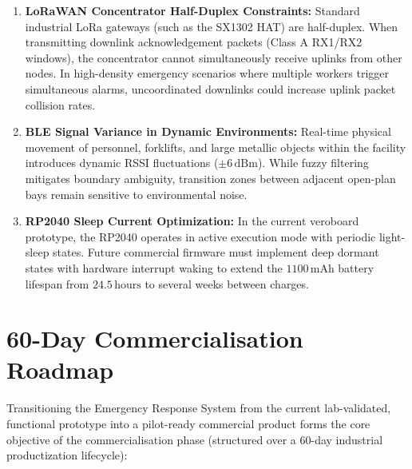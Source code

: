 \begin{enumerate}
    \item \textbf{LoRaWAN Concentrator Half-Duplex Constraints:} Standard industrial LoRa gateways (such as the SX1302 HAT) are half-duplex. When transmitting downlink acknowledgement packets (Class A RX1/RX2 windows), the concentrator cannot simultaneously receive uplinks from other nodes. In high-density emergency scenarios where multiple workers trigger simultaneous alarms, uncoordinated downlinks could increase uplink packet collision rates.
    \item \textbf{BLE Signal Variance in Dynamic Environments:} Real-time physical movement of personnel, forklifts, and large metallic objects within the facility introduces dynamic RSSI fluctuations ($\pm 6\,\text{dBm}$). While fuzzy filtering mitigates boundary ambiguity, transition zones between adjacent open-plan bays remain sensitive to environmental noise.
    \item \textbf{RP2040 Sleep Current Optimization:} In the current veroboard prototype, the RP2040 operates in active execution mode with periodic light-sleep states. Future commercial firmware must implement deep dormant states with hardware interrupt waking to extend the $1100\,\text{mAh}$ battery lifespan from $24.5\,\text{hours}$ to several weeks between charges.
\end{enumerate}

\section{60-Day Commercialisation Roadmap}
Transitioning the Emergency Response System from the current lab-validated, functional prototype into a pilot-ready commercial product forms the core objective of the commercialisation phase (structured over a 60-day industrial productization lifecycle):

